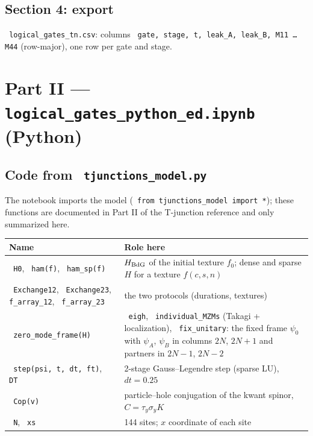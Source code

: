\documentclass[11pt]{article}
\renewcommand{\code}[1]{\texttt{\hyphenchar\font=-1 #1}}
\begin{document}
\subsection{Section 4: export}

\code{logical\_gates\_tn.csv}: columns \code{gate, stage, t, leak\_A, leak\_B, M11 \dots M44} (row-major), one row per gate and stage.

\section{Part II --- \code{logical\_gates\_python\_ed.ipynb} (Python)}

\subsection{Code from \code{tjunctions\_model.py}}

The notebook imports the model (\code{from tjunctions\_model import *}); these functions are documented in Part II of the T-junction
reference and only summarized here.

\begin{center}
\begin{tabularx}{\textwidth}{lX}
\toprule
Name & Role here\\
\midrule
\code{H0}, \code{ham(f)}, \code{ham\_sp(f)} & $H_{\rm BdG}$ of the initial texture $f_0$; dense and sparse $H$ for a texture $f(c,s,n)$\\
\code{Exchange12}, \code{Exchange23}, \code{f\_array\_12}, \code{f\_array\_23} & the two protocols (durations, textures)\\
\code{zero\_mode\_frame(H)} & \code{eigh}, \code{individual\_MZMs} (Takagi + localization), \code{fix\_unitary}: the fixed frame $\psi_0$ with $\psi_A$, $\psi_B$ in columns $2N$, $2N+1$ and partners in $2N-1$, $2N-2$\\
\code{step(psi, t, dt, ft)}, \code{DT} & 2-stage Gauss--Legendre step (sparse LU), $dt = 0.25$\\
\code{Cop(v)} & particle--hole conjugation of the kwant spinor, $C = \tau_y\sigma_yK$\\
\code{N}, \code{xs} & 144 sites; $x$ coordinate of each site\\
\bottomrule
\end{tabularx}
\end{center}
\end{document}
